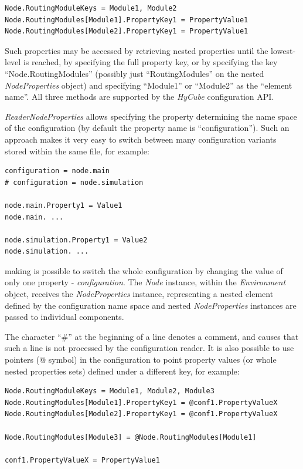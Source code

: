 \begin{lstlisting}[style=listing1noindent]
Node.RoutingModuleKeys = Module1, Module2
Node.RoutingModules[Module1].PropertyKey1 = PropertyValue1
Node.RoutingModules[Module2].PropertyKey1 = PropertyValue1
\end{lstlisting}

\noindent
Such properties may be accessed by retrieving nested properties until the lowest-level is reached, by specifying the full property key, or by specifying the key ``Node.RoutingModules'' (possibly just ``RoutingModules'' on the nested \emph{NodeProperties} object) and specifying ``Module1'' or ``Module2'' as the ``element name''. All three methods are supported by the \emph{HyCube} configuration API.


\emph{ReaderNodeProperties} allows specifying the property determining the name space of the configuration (by default the property name is ``configuration''). Such an approach makes it very easy to switch between many configuration variants stored within the same file, for example:

\begin{lstlisting}[style=listing1noindent]
configuration = node.main
# configuration = node.simulation

node.main.Property1 = Value1
node.main. ...

node.simulation.Property1 = Value2
node.simulation. ...
\end{lstlisting}

\noindent
making is possible to switch the whole configuration by changing the value of only one property - \emph{configuration}. The \emph{Node} instance, within the \emph{Environment} object, receives the \emph{NodeProperties} instance, representing a nested element defined by the configuration name space and nested \emph{NodeProperties} instances are passed to individual components.

The character ``\#'' at the beginning of a line denotes a comment, and causes that such a line is not processed by the configuration reader. It is also possible to use pointers (@ symbol) in the configuration to point property values (or whole nested properties sets) defined under a different key, for example:

\begin{lstlisting}[style=listing1noindent]
Node.RoutingModuleKeys = Module1, Module2, Module3
Node.RoutingModules[Module1].PropertyKey1 = @conf1.PropertyValueX
Node.RoutingModules[Module2].PropertyKey1 = @conf1.PropertyValueX

Node.RoutingModules[Module3] = @Node.RoutingModules[Module1]

conf1.PropertyValueX = PropertyValue1
\end{lstlisting}

